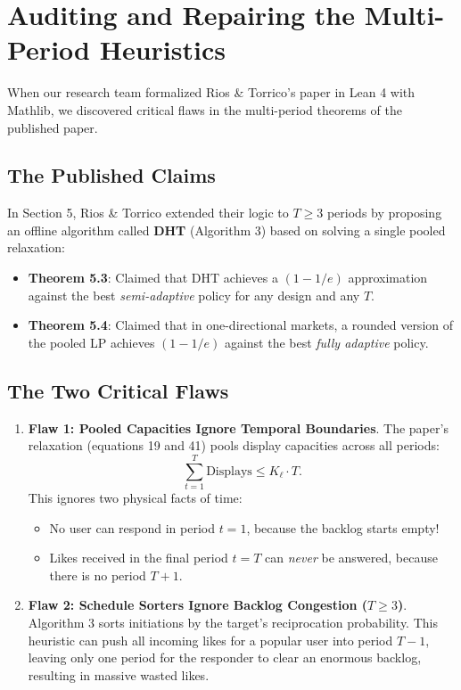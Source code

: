 \documentclass[11pt,letterpaper]{article}
\theoremstyle{definition}
\theoremstyle{plain}
\theoremstyle{remark}
\begin{document}
\newpage
\section{Auditing and Repairing the Multi-Period Heuristics}
\label{sec:audit}

When our research team formalized Rios \& Torrico's paper in Lean 4 with Mathlib, we discovered critical flaws in the multi-period theorems of the published paper. 

\subsection{The Published Claims}
In Section 5, Rios \& Torrico extended their logic to $T \ge 3$ periods by proposing an offline algorithm called \textbf{DHT} (Algorithm 3) based on solving a single pooled relaxation:
\begin{itemize}
    \item \textbf{Theorem 5.3}: Claimed that DHT achieves a $(1 - 1/e)$ approximation against the best \emph{semi-adaptive} policy for any design and any $T$.
    \item \textbf{Theorem 5.4}: Claimed that in one-directional markets, a rounded version of the pooled LP achieves $(1 - 1/e)$ against the best \emph{fully adaptive} policy.
\end{itemize}

\subsection{The Two Critical Flaws}
\begin{warningbox}
\begin{enumerate}[leftmargin=1.5em]
    \item \textbf{Flaw 1: Pooled Capacities Ignore Temporal Boundaries}.
    The paper's relaxation (equations 19 and 41) pools display capacities across all periods:
    $$\sum_{t=1}^T \text{Displays} \le K_\ell \cdot T.$$
    This ignores two physical facts of time:
    \begin{itemize}
        \item No user can respond in period $t=1$, because the backlog starts empty!
        \item Likes received in the final period $t=T$ can \emph{never} be answered, because there is no period $T+1$.
    \end{itemize}
    \item \textbf{Flaw 2: Schedule Sorters Ignore Backlog Congestion ($T \ge 3$)}.
    Algorithm 3 sorts initiations by the target's reciprocation probability. This heuristic can push all incoming likes for a popular user into period $T-1$, leaving only one period for the responder to clear an enormous backlog, resulting in massive wasted likes.
\end{enumerate}
\end{warningbox}
\end{document}
